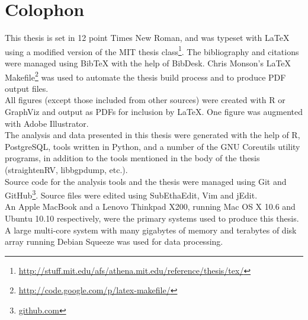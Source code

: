 {}
\chapter*{Colophon}
\begin{singlespace}
\noindent
This thesis is set in 12 point Times New Roman, and was typeset with \LaTeX{}
using a modified version of the MIT thesis class\footnote{
\url{http://stuff.mit.edu/afs/athena.mit.edu/reference/thesis/tex/}}.
The bibliography and citations were managed using {{\sc Bib}\TeX} with the help
of BibDesk. Chris Monson's \LaTeX{} Makefile\footnote{
\url{http://code.google.com/p/latex-makefile/}} was used to automate the thesis
build process and to produce PDF output files.
\\

\noindent
All figures (except those included from other sources) were created with R or
GraphViz and output as PDFs for inclusion by \LaTeX{}. One figure was augmented
with Adobe Illustrator.
\\

\noindent
The analysis and data presented in this thesis were generated with the help of
R, PostgreSQL, tools written in Python, and a number of the GNU Coreutils
utility programs, in addition to the tools mentioned in the body of the thesis
(straightenRV, libbgpdump, etc.).
\\

\noindent
Source code for the analysis tools and the thesis were managed using Git and
GitHub\footnote{\url{github.com}}. Source files were edited using SubEthaEdit,
Vim and jEdit.
\\

\noindent
An Apple MacBook and a Lenovo Thinkpad X200, running Mac OS X 10.6 and Ubuntu
10.10 respectively, were the primary systems used to produce this thesis. A
large multi-core system with many gigabytes of memory and terabytes of disk
array running Debian Squeeze was used for data processing.
\\

\end{singlespace}
